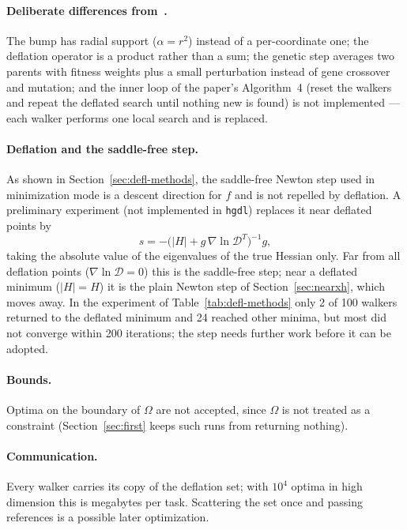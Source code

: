 \documentclass[11pt]{article}
\newcommand{\code}[1]{\texttt{#1}}
\begin{document}
\paragraph{Deliberate differences from~\cite{noack2017}.}
The bump has radial support ($\alpha = r^2$) instead of a per-coordinate one; the deflation
operator is a product rather than a sum; the genetic step averages two parents with fitness
weights plus a small perturbation instead of gene crossover and mutation; and the inner loop of
the paper's Algorithm~4 (reset the walkers and repeat the deflated search until nothing new is
found) is not implemented --- each walker performs one local search and is replaced.

\paragraph{Deflation and the saddle-free step.}
As shown in Section~\ref{sec:defl-methods}, the saddle-free Newton step used in minimization
mode is a descent direction for $f$ and is not repelled by deflation. A preliminary experiment
(not implemented in \code{hgdl}) replaces it near deflated points by
\[
  s = -\big(|H| + g\,\nabla\ln\mathcal{D}^T\big)^{-1} g ,
\]
taking the absolute value of the eigenvalues of the true Hessian only. Far from all deflation
points ($\nabla\ln\mathcal{D} = 0$) this is the saddle-free step; near a deflated minimum
($|H| = H$) it is the plain Newton step of Section~\ref{sec:nearxh}, which moves away. In the
experiment of Table~\ref{tab:defl-methods} only 2 of 100 walkers returned to the deflated
minimum and 24 reached other minima, but most did not converge within 200 iterations; the
step needs further work before it can be adopted.

\paragraph{Bounds.} Optima on the boundary of $\Omega$ are not accepted, since $\Omega$ is not
treated as a constraint (Section~\ref{sec:first} keeps such runs from returning nothing).

\paragraph{Communication.} Every walker carries its copy of the deflation set; with
$10^4$ optima in high dimension this is megabytes per task. Scattering the set once and
passing references is a possible later optimization.
\end{document}
